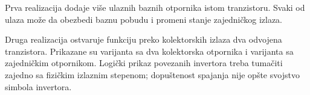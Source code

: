 Prva realizacija dodaje više ulaznih baznih otpornika istom tranzistoru. Svaki od ulaza može da obezbedi baznu pobudu i promeni stanje zajedničkog izlaza.

Druga realizacija ostvaruje funkciju preko kolektorskih izlaza dva odvojena tranzistora. Prikazane su varijanta sa dva kolektorska otpornika i varijanta sa zajedničkim otpornikom. Logički prikaz povezanih invertora treba tumačiti zajedno sa fizičkim izlaznim stepenom; dopuštenost spajanja nije opšte svojstvo simbola invertora.
